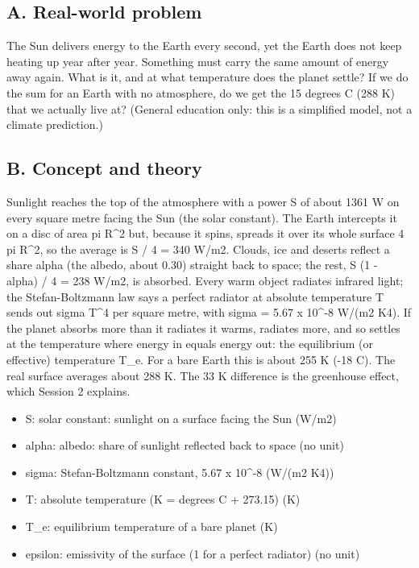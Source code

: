 \documentclass[11pt,a4paper]{article}
\begin{document}
\subsection*{A. Real-world problem}
The Sun delivers energy to the Earth every second, yet the Earth does not keep heating up year after year. Something must carry the same amount of energy away again. What is it, and at what temperature does the planet settle? If we do the sum for an Earth with no atmosphere, do we get the 15 degrees C (288 K) that we actually live at? (General education only: this is a simplified model, not a climate prediction.)

\subsection*{B. Concept and theory}
Sunlight reaches the top of the atmosphere with a power S of about 1361 W on every square metre facing the Sun (the solar constant). The Earth intercepts it on a disc of area pi R\textasciicircum{}2 but, because it spins, spreads it over its whole surface 4 pi R\textasciicircum{}2, so the average is S / 4 = 340 W/m2. Clouds, ice and deserts reflect a share alpha (the albedo, about 0.30) straight back to space; the rest, S (1 - alpha) / 4 = 238 W/m2, is absorbed. Every warm object radiates infrared light; the Stefan-Boltzmann law says a perfect radiator at absolute temperature T sends out sigma T\textasciicircum{}4 per square metre, with sigma = 5.67 x 10\textasciicircum{}-8 W/(m2 K4). If the planet absorbs more than it radiates it warms, radiates more, and so settles at the temperature where energy in equals energy out: the equilibrium (or effective) temperature T\_e. For a bare Earth this is about 255 K (-18 C). The real surface averages about 288 K. The 33 K difference is the greenhouse effect, which Session 2 explains.

\begin{itemize}[nosep]
\item S: solar constant: sunlight on a surface facing the Sun (W/m2)
\item alpha: albedo: share of sunlight reflected back to space (no unit)
\item sigma: Stefan-Boltzmann constant, 5.67 x 10\textasciicircum{}-8 (W/(m2 K4))
\item T: absolute temperature (K = degrees C + 273.15) (K)
\item T\_e: equilibrium temperature of a bare planet (K)
\item epsilon: emissivity of the surface (1 for a perfect radiator) (no unit)
\end{itemize}
\end{document}
